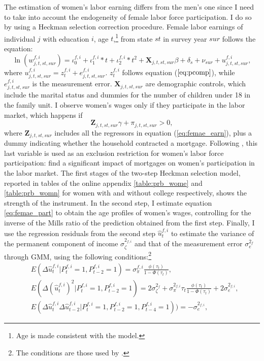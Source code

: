 \documentclass[12pt]{article}
\begin{document}
The estimation of women's labor earning differs from the men's one since I need to take into account the endogeneity of female labor force participation. I do so by using a Heckman selection correction procedure. Female labor earnings of individual $j$ with education $i$, age $t$,\footnote{Age is made consistent with the model.} from state $st$  in survey year $sur$ follows the equation:
\begin{equation}\label{eq:femae_earn}
\ln(w^{f,i}_{j,t,st,sur})=\iota^{f,i}_0+\iota^{f,i}_1*t+\iota^{f,i}_2*t^2+\mathbf{X}_{j,t,st,sur}\beta+\delta_s+\nu_{sur}+u_{j,t,st,sur}^{f,i},
\end{equation}
where $u_{j,t,st,sur}^{f,i}=z_t^{f,i}+e^{f,i}_{j,t,st,sur}$. $z_t^{f,i}$ follows equation ($\ref{eq:pcomp}$), while $e^{f,i}_{j,t,st,sur}$ is the measurement error.  $\mathbf{X}_{j,t,st,sur}$ are demographic controls, which include the marital status and dummies for the number of children under 18 in the family unit. I observe women's wages only if they participate in the labor market, which happens if
\begin{equation}\label{eq:femae_part}
\mathbf{Z}_{j,t,st,sur}\gamma+\pi_{j,t,st,sur}>0,
\end{equation}
where $\mathbf{Z}_{j,t,st,sur}$ includes all the regressors in equation (\ref{eq:femae_earn}), plus a dummy indicating whether the household contracted a mortgage. Following \cite{blundell2016}, this last variable is used as an exclusion restriction for women's labor force participation: \cite{del2003} find a significant impact of mortgages on women's participation in the labor market. The first stages of the two-step Heckman selection model, reported in tables of the online appendix \ref{table:prb_wome} and \ref{table:prb_womn} for women with and without college respectively, shows the strength of the instrument. In the second step, I estimate equation \ref{eq:femae_part} to obtain the age profiles of women's wages, controlling for the inverse of the Mills ratio of the prediction obtained from the first step. Finally, I use the regression residuals from the second step $\hat{u}_{t}^{f,i}$  to estimate the variance of the permanent component of income $\sigma_\zeta^{2_{f,i}}$ and that of the measurement error $\sigma_e^{2_f}$ through GMM, using the following conditions:\footnote{The conditions are those used by \cite{low2018}.}
\begin{equation}\label{eq:female_gmm}
\begin{split}
&E(\Delta\hat{u}_{t}^{f,i} | P^{f,i}_t=1,P^{f,i}_{t-2}=1)=\sigma_\pi^{f,i}\frac{\phi(\tau_t)}{1-\Phi(\tau_t)},\\
&E(\Delta(\hat{u}_{t}^{f,i})^2 | P^{f,i}_t=1,P^{f,i}_{t-2}=1)=2 \sigma_\zeta^{2_f}+\sigma_\pi^{2_{f,i}}\tau_t\frac{\phi(\tau_t)}{1-\Phi(\tau_t)}+2\sigma_e^{2_{f,i}},\\
&E(\Delta\hat{u}_{t}^{f,i}\Delta\hat{u}_{t-2}^{f,i} | P^{f,i}_t=1,P^{f,i}_{t-2}=1,P^{f,i}_{t-4}=1))=-\sigma_e^{2_{f,i}},
\end{split}
\end{equation}
\end{document}

